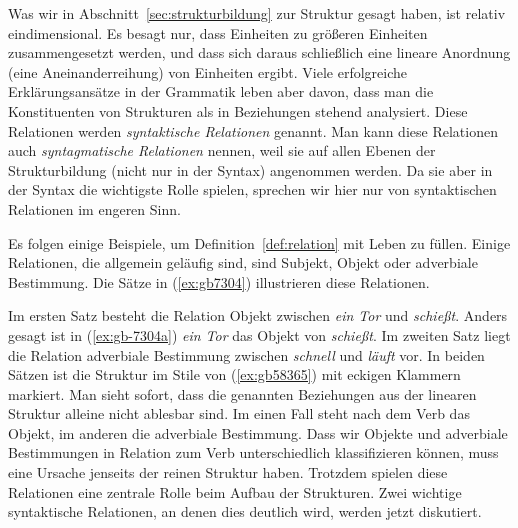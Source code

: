 \label{sec:rektionkongruenz}

Was wir in Abschnitt~\ref{sec:strukturbildung} zur Struktur gesagt haben, ist relativ eindimensional.
Es besagt nur, dass Einheiten zu größeren Einheiten zusammengesetzt werden, und dass sich daraus schließlich eine lineare Anordnung (eine Aneinanderreihung) von Einheiten ergibt.
Viele erfolgreiche Erklärungsansätze in der Grammatik leben aber davon, dass man die Konstituenten von Strukturen als in Beziehungen stehend analysiert.
Diese Relationen werden \textit{syntaktische Relationen} genannt.
Man kann diese Relationen auch \textit{syntagmatische Relationen} nennen, weil sie auf allen Ebenen der Strukturbildung (nicht nur in der Syntax) angenommen werden.
Da sie aber in der Syntax die wichtigste Rolle spielen, sprechen wir hier nur von syntaktischen Relationen im engeren Sinn.


Es folgen einige Beispiele, um Definition~\ref{def:relation} mit Leben zu füllen.
Einige Relationen, die allgemein geläufig sind, sind Subjekt, Objekt oder adverbiale Bestimmung.
Die Sätze in (\ref{ex:gb7304}) illustrieren diese Relationen.

\begin{exe}
  \ex\label{ex:gb7304}
  \begin{xlist}
  \end{xlist}
\end{exe}

Im ersten Satz besteht die Relation Objekt zwischen \textit{ein Tor} und \textit{schießt}.
Anders gesagt ist in (\ref{ex:gb-7304a}) \textit{ein Tor} das Objekt von \textit{schießt}.
Im zweiten Satz liegt die Relation adverbiale Bestimmung zwischen \textit{schnell} und \textit{läuft} vor.
In beiden Sätzen ist die Struktur im Stile von (\ref{ex:gb58365}) mit eckigen Klammern markiert.
Man sieht sofort, dass die genannten Beziehungen aus der linearen Struktur alleine nicht ablesbar sind.
Im einen Fall steht nach dem Verb das Objekt, im anderen die adverbiale Bestimmung.
Dass wir Objekte und adverbiale Bestimmungen in Relation zum Verb unterschiedlich klassifizieren können, muss eine Ursache jenseits der reinen Struktur haben.
Trotzdem spielen diese Relationen eine zentrale Rolle beim Aufbau der Strukturen.
Zwei wichtige syntaktische Relationen, an denen dies deutlich wird, werden jetzt diskutiert.

